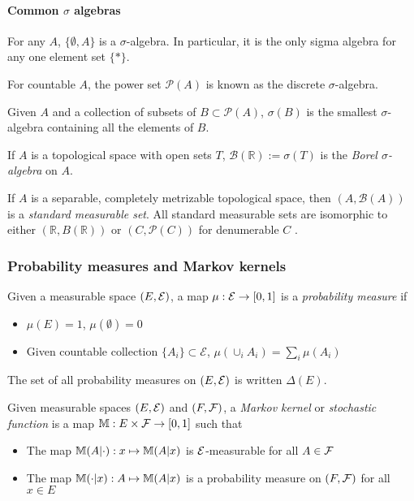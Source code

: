 \paragraph{Common $\sigma$ algebras}

For any $A$, $\{\emptyset,A\}$ is a $\sigma$-algebra. In particular, it is the only sigma algebra for any one element set $\{*\}$.

For countable $A$, the power set $\mathscr{P}(A)$ is known as the discrete $\sigma$-algebra.

Given $A$ and a collection of subsets of $B\subset\mathscr{P}(A)$, $\sigma(B)$ is the smallest $\sigma$-algebra containing all the elements of $B$. 

If $A$ is a topological space with open sets $T$, $\mathcal{B}(\mathbb{R}):=\sigma(T)$ is the \emph{Borel $\sigma$-algebra} on $A$.

If $A$ is a separable, completely metrizable topological space, then $(A,\mathcal{B}(A))$ is a \emph{standard measurable set}. All standard measurable sets are isomorphic to either $(\mathbb{R},B(\mathbb{R}))$ or $(C,\mathscr{P}(C))$ for denumerable $C$ \citep[Chap. 1]{cinlar_probability_2011}.

\subsubsection{Probability measures and Markov kernels}

\begin{definition}\label{def:prob_meas}
Given a measurable space $(E,\mathcal{E})$, a map $\mu:\mathcal{E}\to [0,1]$ is a \emph{probability measure} if
\begin{itemize}
	\item $\mu(E)=1$, $\mu(\emptyset)=0$
	\item Given countable collection $\{A_i\}\subset\mathscr{E}$, $\mu(\cup_{i} A_i) = \sum_i \mu(A_i)$
\end{itemize}
\end{definition}

\begin{notation}\label{no:prob_meas_set}
The set of all probability measures on $(E,\mathcal{E})$ is written $\Delta(E)$.
\end{notation}

\begin{definition}\label{def:markov_kern}
Given measurable spaces $(E,\mathcal{E})$ and $(F,\mathcal{F})$, a \emph{Markov kernel} or \emph{stochastic function} is a map $\mathbb{M}:E\times\mathcal{F}\to [0,1]$ such that
\begin{itemize}
	\item The map $\mathbb{M}(A|\cdot):x\mapsto \mathbb{M}(A|x)$ is $\mathcal{E}$-measurable for all $A\in \mathcal{F}$
	\item The map $\mathbb{M}(\cdot|x):A\mapsto \mathbb{M}(A|x)$ is a probability measure on $(F,\mathcal{F})$ for all $x\in E$
\end{itemize}
\end{definition}

